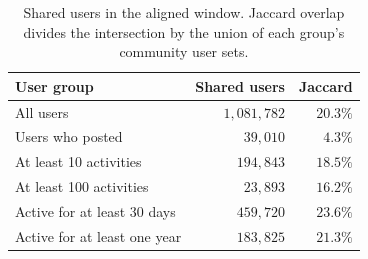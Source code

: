 \begin{table}[H]
  \centering
  \begin{tabular}{@{}lrr@{}}
    \toprule
    User group & Shared users & Jaccard \\
    \midrule
    All users                    & $1{,}081{,}782$ & $20.3\%$ \\
    Users who posted             & $39{,}010$      & $4.3\%$  \\
    At least 10 activities       & $194{,}843$     & $18.5\%$ \\
    At least 100 activities      & $23{,}893$      & $16.2\%$ \\
    Active for at least 30 days  & $459{,}720$     & $23.6\%$ \\
    Active for at least one year & $183{,}825$     & $21.3\%$ \\
    \bottomrule
  \end{tabular}
  \caption{Shared users in the aligned window. Jaccard overlap divides the
  intersection by the union of each group's community user sets.}
  \label{tab:shared-users}
\end{table}
